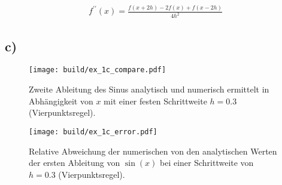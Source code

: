 \begin{align*}
    f^{\prime \prime} (x) = \frac{f(x+2h) - 2 f(x) + f(x-2h)}{4h^2}
\end{align*}
\FloatBarrier
\subsection*{c)}

\begin{figure}
    \centering
    \texttt{[image: build/ex\_1c\_compare.pdf]}
    \caption{Zweite Ableitung des Sinus analytisch und numerisch ermittelt in Abhängigkeit von 
    $x$ mit einer festen Schrittweite $h=0.3$ (Vierpunktsregel).}
    \label{fig:c_comp}
\end{figure}

\begin{figure}
    \centering
    \texttt{[image: build/ex\_1c\_error.pdf]}
    \caption{Relative Abweichung der numerischen von den analytischen Werten der ersten Ableitung von $\sin(x)$
    bei einer Schrittweite von $h=0.3$ (Vierpunktsregel).}
    \label{fig:rel_c}
\end{figure}
